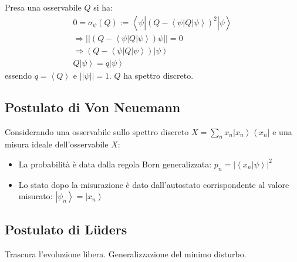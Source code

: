 Presa una osservabile $Q$ si ha:
\begin{equation}\begin{split}
0=\sigma_\psi \left(Q\right):=\left\langle \psi |\left(Q-\left\langle \psi |Q|\psi  \right\rangle\right)^2|\psi \right\rangle\\
\Longrightarrow ||\left(Q-\left\langle \psi |Q|\psi  \right\rangle\right)\psi ||=0 \\
\Longrightarrow \left(Q-\left\langle \psi |Q|\psi  \right\rangle\right)\left |\psi  \right\rangle \\
Q\left |\psi  \right\rangle=q\left |\psi  \right\rangle
\end{split}\end{equation}
essendo $q=\left\langle Q \right\rangle$ e $||\psi ||=1$. $Q$ ha spettro discreto.

\subsection{Postulato di Von Neuemann} %
Considerando una osservabile sullo spettro discreto $X=\sum_n{x_n\left |x_n \right\rangle\left\langle x_n\right |}$ e una misura ideale dell'osservabile $X$:
\begin{itemize}
\item La probabilità è data dalla regola Born generalizzata: $p_n=|\left\langle x_n|\psi  \right\rangle|^2$
\item Lo stato dopo la misurazione è dato dall'autostato corrispondente al valore misurato: $\left |\psi _n \right\rangle=\left |x_n \right\rangle$
\end{itemize}

\subsection{Postulato di Lüders} %
Trascura l'evoluzione libera. Generalizzazione del minimo disturbo.

